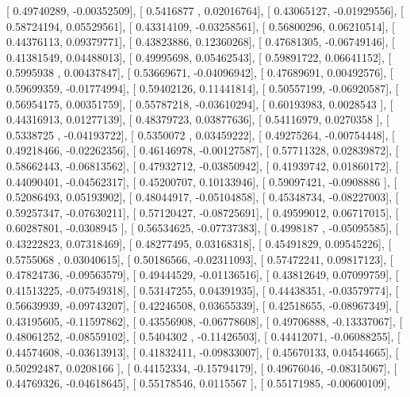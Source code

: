 \documentclass{article}
\begin{document}
       [ 0.49740289, -0.00352509],
       [ 0.5416877 ,  0.02016764],
       [ 0.43065127, -0.01929556],
       [ 0.58724194,  0.05529561],
       [ 0.43314109, -0.03258561],
       [ 0.56800296,  0.06210514],
       [ 0.44376113,  0.09379771],
       [ 0.43823886,  0.12360268],
       [ 0.47681305, -0.06749146],
       [ 0.41381549,  0.04488013],
       [ 0.49995698,  0.05462543],
       [ 0.59891722,  0.06641152],
       [ 0.5995938 ,  0.00437847],
       [ 0.53669671, -0.04096942],
       [ 0.47689691,  0.00492576],
       [ 0.59699359, -0.01774994],
       [ 0.59402126,  0.11441814],
       [ 0.50557199, -0.06920587],
       [ 0.56954175,  0.00351759],
       [ 0.55787218, -0.03610294],
       [ 0.60193983,  0.0028543 ],
       [ 0.44316913,  0.01277139],
       [ 0.48379723,  0.03877636],
       [ 0.54116979,  0.0270358 ],
       [ 0.5338725 , -0.04193722],
       [ 0.5350072 ,  0.03459222],
       [ 0.49275264, -0.00754448],
       [ 0.49218466, -0.02262356],
       [ 0.46146978, -0.00127587],
       [ 0.57711328,  0.02839872],
       [ 0.58662443, -0.06813562],
       [ 0.47932712, -0.03850942],
       [ 0.41939742,  0.01860172],
       [ 0.44090401, -0.04562317],
       [ 0.45200707,  0.10133946],
       [ 0.59097421, -0.0908886 ],
       [ 0.52086493,  0.05193902],
       [ 0.48044917, -0.05104858],
       [ 0.45348734, -0.08227003],
       [ 0.59257347, -0.07630211],
       [ 0.57120427, -0.08725691],
       [ 0.49599012,  0.06717015],
       [ 0.60287801, -0.0308945 ],
       [ 0.56534625, -0.07737383],
       [ 0.4998187 , -0.05095585],
       [ 0.43222823,  0.07318469],
       [ 0.48277495,  0.03168318],
       [ 0.45491829,  0.09545226],
       [ 0.5755068 ,  0.03040615],
       [ 0.50186566, -0.02311093],
       [ 0.57472241,  0.09817123],
       [ 0.47824736, -0.09563579],
       [ 0.49444529, -0.01136516],
       [ 0.43812649,  0.07099759],
       [ 0.41513225, -0.07549318],
       [ 0.53147255,  0.04391935],
       [ 0.44438351, -0.03579774],
       [ 0.56639939, -0.09743207],
       [ 0.42246508,  0.03655339],
       [ 0.42518655, -0.08967349],
       [ 0.43195605, -0.11597862],
       [ 0.43556908, -0.06778608],
       [ 0.49706888, -0.13337067],
       [ 0.48061252, -0.08559102],
       [ 0.5404302 , -0.11426503],
       [ 0.44412071, -0.06088255],
       [ 0.44574608, -0.03613913],
       [ 0.41832411, -0.09833007],
       [ 0.45670133,  0.04544665],
       [ 0.50292487,  0.0208166 ],
       [ 0.44152334, -0.15794179],
       [ 0.49676046, -0.08315067],
       [ 0.44769326, -0.04618645],
       [ 0.55178546,  0.0115567 ],
       [ 0.55171985, -0.00600109],
\end{document}
